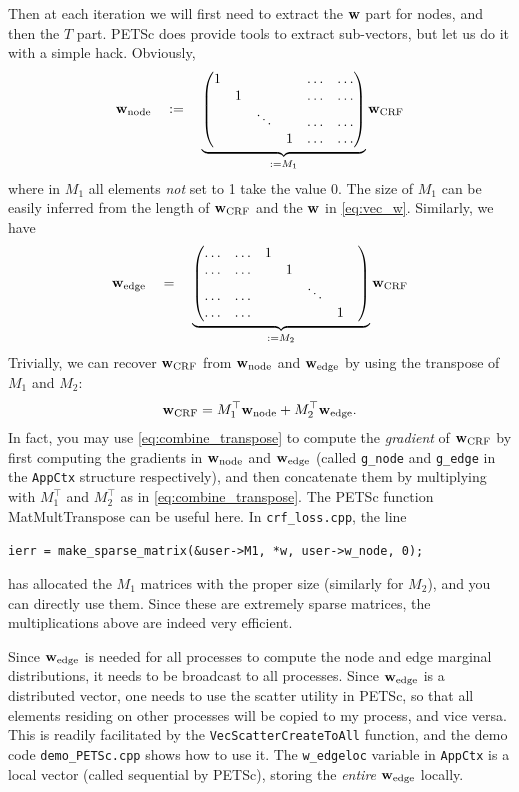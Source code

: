 \documentclass[11pt]{report}
\begin{document}
Then at each iteration we will first need to extract the $\mathbf{\boldsymbol{w}}$ part for nodes, and then the $T$ part.
PETSc does provide tools to extract sub-vectors,
but let us do it with a simple hack.
Obviously,
\begin{align}
  {\mathbf{\boldsymbol{w}}_{\text{node}}} \quad := \quad \underbrace{ \begin{pmatrix}
    1 &   &   &   & \ldots & \ldots \\
     & 1 &   &   & \ldots & \ldots \\
     & & \ddots &  & \ldots & \ldots \\
     &  &  & 1 & \ldots & \ldots
  \end{pmatrix}}_{:= M_1} {\mathbf{\boldsymbol{w}}_{\text{CRF}}}
\end{align}
where in $M_1$ all elements \emph{not} set to 1 take the value 0.
The size of $M_1$ can be easily inferred from the length of ${\mathbf{\boldsymbol{w}}_{\text{CRF}}}$ and the $\mathbf{\boldsymbol{w}}$ in \eqref{eq:vec_w}.
Similarly, we have
\begin{align}
  {\mathbf{\boldsymbol{w}}_{\text{edge}}}
  \quad = \quad \underbrace{ \begin{pmatrix}
    \ldots & \ldots & 1 &   &   &    \\
     \ldots & \ldots & & 1 &   &   & \\
     \ldots & \ldots & & & \ddots &  & \\
    \ldots & \ldots & &  &  & 1 &
  \end{pmatrix}}_{:= M_2} {\mathbf{\boldsymbol{w}}_{\text{CRF}}}
\end{align}
Trivially, we can recover ${\mathbf{\boldsymbol{w}}_{\text{CRF}}}$ from ${\mathbf{\boldsymbol{w}}_{\text{node}}}$ and ${\mathbf{\boldsymbol{w}}_{\text{edge}}}$ by using the transpose of $M_1$ and $M_2$:
\begin{align}
\label{eq:combine_transpose}
  {\mathbf{\boldsymbol{w}}_{\text{CRF}}} = M_1^\top {\mathbf{\boldsymbol{w}}_{\text{node}}} + M_2^\top {\mathbf{\boldsymbol{w}}_{\text{edge}}}.
\end{align}
In fact, you may use \eqref{eq:combine_transpose} to compute the \emph{gradient} of ${\mathbf{\boldsymbol{w}}_{\text{CRF}}}$ by first computing the gradients in ${\mathbf{\boldsymbol{w}}_{\text{node}}}$ and ${\mathbf{\boldsymbol{w}}_{\text{edge}}}$ (called \verb!g_node! and \verb!g_edge! in the \verb!AppCtx! structure respectively), and then concatenate them by multiplying with $M_1^\top$ and $M_2^\top$ as in \eqref{eq:combine_transpose}.
The PETSc function MatMultTranspose can be useful here.
In \verb!crf_loss.cpp!, the line

\verb!ierr = make_sparse_matrix(&user->M1, *w, user->w_node, 0);!

has allocated the $M_1$ matrices with the proper size (similarly for $M_2$),
and you can directly use them.
Since these are extremely sparse matrices, the multiplications above are indeed very efficient.

Since ${\mathbf{\boldsymbol{w}}_{\text{edge}}}$ is needed for all processes to compute the node and edge marginal distributions,
it needs to be broadcast to all processes.
Since ${\mathbf{\boldsymbol{w}}_{\text{edge}}}$ is a distributed vector,
one needs to use the scatter utility in PETSc,
so that all elements residing on other processes will be copied to my process,
and vice versa.
This is readily facilitated by the \verb!VecScatterCreateToAll! function,
and the demo code \verb!demo_PETSc.cpp! shows how to use it.
The \verb!w_edgeloc! variable in \verb!AppCtx! is a local vector (called sequential by PETSc),
storing the \emph{entire} ${\mathbf{\boldsymbol{w}}_{\text{edge}}}$ locally.
\end{document}
